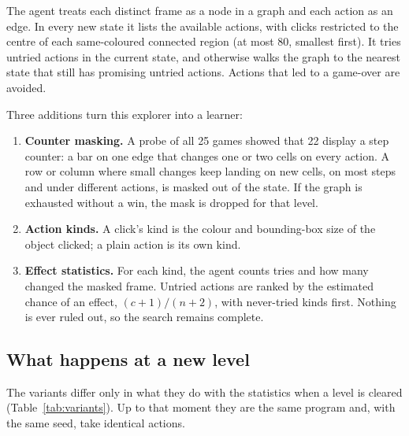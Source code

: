 \documentclass[11pt,a4paper]{article}
\begin{document}
The agent treats each distinct frame as a node in a graph and each action as an edge. In every new state it lists the available actions, with clicks restricted to the centre of each same-coloured connected region (at most 80, smallest first). It tries untried actions in the current state, and otherwise walks the graph to the nearest state that still has promising untried actions. Actions that led to a game-over are avoided.

Three additions turn this explorer into a learner:
\begin{enumerate}
  \item \textbf{Counter masking.} A probe of all 25 games showed that 22 display a step counter: a bar on one edge that changes one or two cells on every action. A row or column where small changes keep landing on new cells, on most steps and under different actions, is masked out of the state. If the graph is exhausted without a win, the mask is dropped for that level.
  \item \textbf{Action kinds.} A click's kind is the colour and bounding-box size of the object clicked; a plain action is its own kind.
  \item \textbf{Effect statistics.} For each kind, the agent counts tries and how many changed the masked frame. Untried actions are ranked by the estimated chance of an effect, $(c + 1)/(n + 2)$, with never-tried kinds first. Nothing is ever ruled out, so the search remains complete.
\end{enumerate}

\subsection{What happens at a new level}

The variants differ only in what they do with the statistics when a level is cleared (Table~\ref{tab:variants}). Up to that moment they are the same program and, with the same seed, take identical actions.
\end{document}
